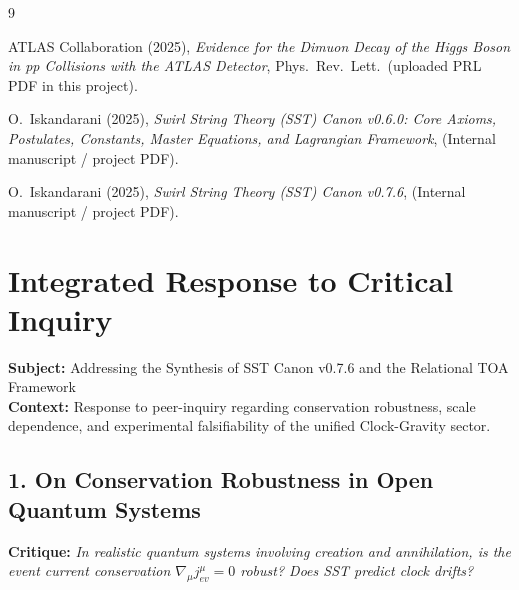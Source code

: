 \documentclass[10pt]{article}
\begin{document}
        \begin{thebibliography}{9}

            ATLAS Collaboration (2025),
            \textit{Evidence for the Dimuon Decay of the Higgs Boson in pp Collisions with the ATLAS Detector},
            Phys.\ Rev.\ Lett.\ (uploaded PRL PDF in this project).

            O.~Iskandarani (2025),
            \textit{Swirl String Theory (SST) Canon v0.6.0: Core Axioms, Postulates, Constants, Master Equations, and Lagrangian Framework},
            (Internal manuscript / project PDF).

            O.~Iskandarani (2025),
            \textit{Swirl String Theory (SST) Canon v0.7.6},
            (Internal manuscript / project PDF).


        \end{thebibliography}


    \section{Integrated Response to Critical Inquiry}

\noindent \textbf{Subject:} Addressing the Synthesis of SST Canon v0.7.6 and the Relational TOA Framework \\
\textbf{Context:} Response to peer-inquiry regarding conservation robustness, scale dependence, and experimental falsifiability of the unified Clock-Gravity sector.

\subsection*{1. On Conservation Robustness in Open Quantum Systems}
\noindent \textbf{Critique:} \textit{In realistic quantum systems involving creation and annihilation, is the event current conservation $\nabla_\mu j^\mu_{ev} = 0$ robust? Does SST predict clock drifts?}
\end{document}
